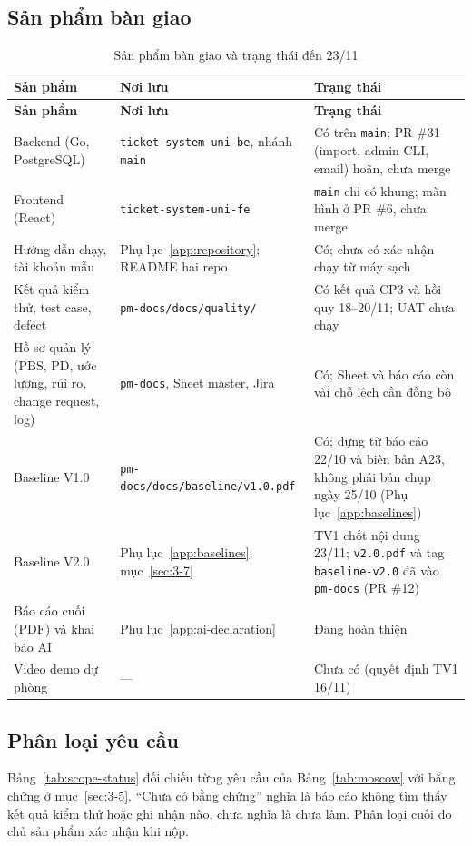 \subsection*{Sản phẩm bàn giao}
\begingroup\tblsetup\tblzebra
\begin{longtable}{L{4.2cm}L{4.4cm}L{4.4cm}}
\caption{Sản phẩm bàn giao và trạng thái đến 23/11}\label{tab:deliverables}\\
\toprule
{}\textbf{Sản phẩm} & \textbf{Nơi lưu} & \textbf{Trạng thái} \\
\midrule
\endfirsthead
\toprule
{}\textbf{Sản phẩm} & \textbf{Nơi lưu} & \textbf{Trạng thái} \\
\midrule
\endhead
\bottomrule
\endlastfoot
Backend (Go, PostgreSQL) & \texttt{ticket-system-uni-be}, nhánh \texttt{main} & Có trên \texttt{main}; PR \#31 (import, admin CLI, email) hoãn, chưa merge \\
Frontend (React) & \texttt{ticket-system-uni-fe} & \texttt{main} chỉ có khung; màn hình ở PR \#6, chưa merge \\
Hướng dẫn chạy, tài khoản mẫu & Phụ lục~\ref{app:repository}; README hai repo & Có; chưa có xác nhận chạy từ máy sạch \\
Kết quả kiểm thử, test case, defect & \texttt{pm-docs/\allowbreak docs/\allowbreak quality/} & Có kết quả CP3 và hồi quy 18--20/11; UAT chưa chạy \\
Hồ sơ quản lý (PBS, PD, ước lượng, rủi ro, change request, log) & \texttt{pm-docs}, Sheet master, Jira & Có; Sheet và báo cáo còn vài chỗ lệch cần đồng bộ \\
Baseline V1.0 & \texttt{pm-docs/\allowbreak docs/\allowbreak baseline/v1.0.pdf} & Có; dựng từ báo cáo 22/10 và biên bản A23, không phải bản chụp ngày 25/10 (Phụ lục~\ref{app:baselines}) \\
Baseline V2.0 & Phụ lục~\ref{app:baselines}; mục~\ref{sec:3-7} & TV1 chốt nội dung 23/11; \texttt{v2.0.pdf} và tag \texttt{baseline-v2.0} đã vào \texttt{pm-docs} (PR \#12) \\
Báo cáo cuối (PDF) và khai báo AI & Phụ lục~\ref{app:ai-declaration} & Đang hoàn thiện \\
Video demo dự phòng & --- & Chưa có (quyết định TV1 16/11) \\
\end{longtable}
\endgroup

\subsection*{Phân loại yêu cầu}
Bảng~\ref{tab:scope-status} đối chiếu từng yêu cầu của Bảng~\ref{tab:moscow} với bằng chứng ở mục~\ref{sec:3-5}. ``Chưa có bằng chứng'' nghĩa là báo cáo không tìm thấy kết quả kiểm thử hoặc ghi nhận nào, chưa nghĩa là chưa làm. Phân loại cuối do chủ sản phẩm xác nhận khi nộp.

